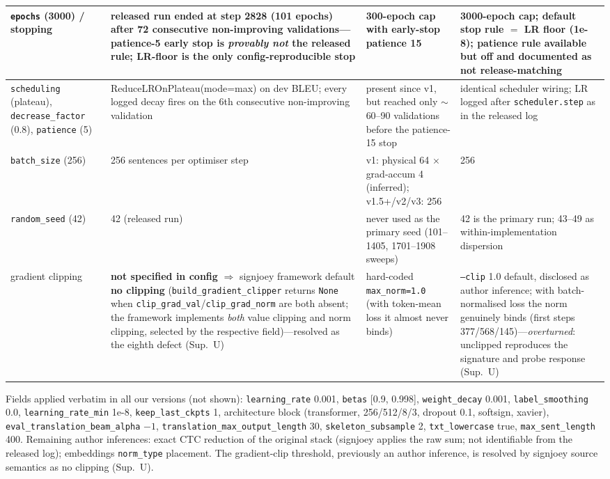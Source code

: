 \documentclass[pdflatex,sn-chicago]{sn-jnl}
\begin{document}
\begin{table}[h]
\begin{tabular}{p{2.9cm}p{3.5cm}p{3.4cm}p{3.4cm}}
\midrule
\texttt{epochs} (3000) / stopping & released run ended at step 2828 (101 epochs) after 72 consecutive non-improving validations---patience-5 early stop is \emph{provably not} the released rule; LR-floor is the only config-reproducible stop & 300-epoch cap with early-stop patience 15 & 3000-epoch cap; default stop rule $=$ LR floor (1e-8); patience rule available but off and documented as not release-matching \\
\midrule
\texttt{scheduling} (plateau), \texttt{decrease\_factor} (0.8), \texttt{patience} (5) & ReduceLROnPlateau(mode=max) on dev BLEU; every logged decay fires on the 6th consecutive non-improving validation & present since v1, but reached only $\sim$60--90 validations before the patience-15 stop & identical scheduler wiring; LR logged after \texttt{scheduler.step} as in the released log \\
\midrule
\texttt{batch\_size} (256) & 256 sentences per optimiser step & v1: physical 64 $\times$ grad-accum 4 (inferred); v1.5+/v2/v3: 256 & 256 \\
\midrule
\texttt{random\_seed} (42) & 42 (released run) & never used as the primary seed (101--1405, 1701--1908 sweeps) & 42 is the primary run; 43--49 as within-implementation dispersion \\
\midrule
gradient clipping & \textbf{not specified in config} $\Rightarrow$ signjoey framework default \textbf{no clipping} (\texttt{build\_gradient\_clipper} returns \texttt{None} when \texttt{clip\_grad\_val}/\texttt{clip\_grad\_norm} are both absent; the framework implements \emph{both} value clipping and norm clipping, selected by the respective field)---resolved as the eighth defect (Sup.~U) & hard-coded \texttt{max\_norm=1.0} (with token-mean loss it almost never binds) & \texttt{--clip} 1.0 default, disclosed as author inference; with batch-normalised loss the norm genuinely binds (first steps 377/568/145)---\emph{overturned}: unclipped reproduces the signature and probe response (Sup.~U) \\
\bottomrule
\end{tabular}
\par\smallskip
{\footnotesize Fields applied verbatim in all our versions (not shown): \texttt{learning\_rate} 0.001, \texttt{betas} [0.9, 0.998], \texttt{weight\_decay} 0.001, \texttt{label\_smoothing} 0.0, \texttt{learning\_rate\_min} 1e-8, \texttt{keep\_last\_ckpts} 1, architecture block (transformer, 256/512/8/3, dropout 0.1, softsign, xavier), \texttt{eval\_translation\_beam\_alpha} $-1$, \texttt{translation\_max\_output\_length} 30, \texttt{skeleton\_subsample} 2, \texttt{txt\_lowercase} true, \texttt{max\_sent\_length} 400. Remaining author inferences: exact CTC reduction of the original stack (signjoey applies the raw sum; not identifiable from the released log); embeddings \texttt{norm\_type} placement. The gradient-clip threshold, previously an author inference, is resolved by signjoey source semantics as no clipping (Sup.~U).}
\end{table}
\end{document}
